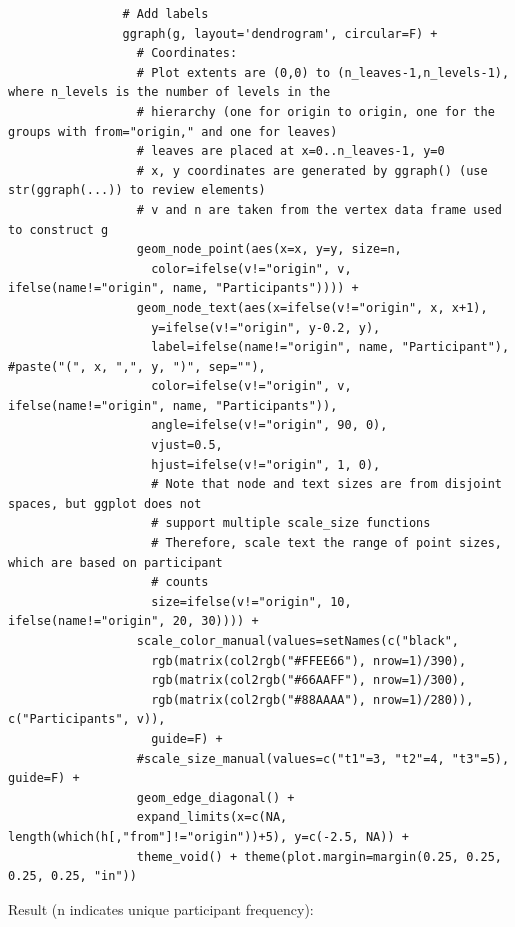 \documentclass[10pt, letterpaper]{article}
\begin{document}
\begin{spacing}{1.0}
\begin{verbatim}
                # Add labels
                ggraph(g, layout='dendrogram', circular=F) +
                  # Coordinates:
                  # Plot extents are (0,0) to (n_leaves-1,n_levels-1), where n_levels is the number of levels in the
                  # hierarchy (one for origin to origin, one for the groups with from="origin," and one for leaves)
                  # leaves are placed at x=0..n_leaves-1, y=0
                  # x, y coordinates are generated by ggraph() (use str(ggraph(...)) to review elements)
                  # v and n are taken from the vertex data frame used to construct g
                  geom_node_point(aes(x=x, y=y, size=n,
                    color=ifelse(v!="origin", v, ifelse(name!="origin", name, "Participants")))) +
                  geom_node_text(aes(x=ifelse(v!="origin", x, x+1),
                    y=ifelse(v!="origin", y-0.2, y),
                    label=ifelse(name!="origin", name, "Participant"), #paste("(", x, ",", y, ")", sep=""),
                    color=ifelse(v!="origin", v, ifelse(name!="origin", name, "Participants")),
                    angle=ifelse(v!="origin", 90, 0),
                    vjust=0.5,
                    hjust=ifelse(v!="origin", 1, 0),
                    # Note that node and text sizes are from disjoint spaces, but ggplot does not
                    # support multiple scale_size functions
                    # Therefore, scale text the range of point sizes, which are based on participant
                    # counts
                    size=ifelse(v!="origin", 10, ifelse(name!="origin", 20, 30)))) +
                  scale_color_manual(values=setNames(c("black",
                    rgb(matrix(col2rgb("#FFEE66"), nrow=1)/390),
                    rgb(matrix(col2rgb("#66AAFF"), nrow=1)/300),
                    rgb(matrix(col2rgb("#88AAAA"), nrow=1)/280)), c("Participants", v)),
                    guide=F) +
                  #scale_size_manual(values=c("t1"=3, "t2"=4, "t3"=5), guide=F) +
                  geom_edge_diagonal() +
                  expand_limits(x=c(NA, length(which(h[,"from"]!="origin"))+5), y=c(-2.5, NA)) +
                  theme_void() + theme(plot.margin=margin(0.25, 0.25, 0.25, 0.25, "in"))
\end{verbatim}
\normalsize

Result (n indicates unique participant frequency):\\


\end{spacing}
\end{document}
